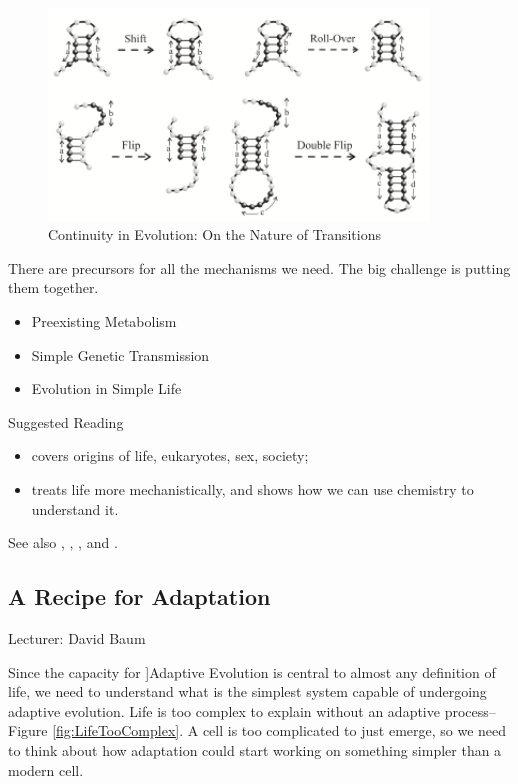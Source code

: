 \documentclass[]{article}
\begin{document}
\begin{figure}[H]
	\caption{Continuity in Evolution: On the Nature of Transitions}\label{fig:ContinuityInEvolution}
	\includegraphics[width=0.9\textwidth]{ContinuityInEvolution}
\end{figure}
There are precursors for all the mechanisms we need. The big challenge is putting them together.
\begin{itemize}
	\item Preexisting Metabolism
	\item Simple Genetic Transmission
	\item Evolution in Simple Life
\end{itemize}

Suggested Reading
\begin{itemize}
	\item \cite{maynard1999origins} covers origins of life, eukaryotes, sex, society; 
	\item \cite{sumper1975evidence} treats life more mechanistically, and shows how we can use chemistry to understand it.
\end{itemize}

See also \cite{orgel2004prebiotic}, \cite{eigen1971selforganization}, \cite{kun2005real}, and \cite{ratcliff2014experimental}.

\subsection{A Recipe for Adaptation}

Lecturer: David Baum

Since the capacity for ]Adaptive Evolution is central to almost any definition of life, we need to understand what is the simplest system capable of undergoing adaptive evolution. Life is too complex to explain without an adaptive
process--Figure \ref{fig:LifeTooComplex}\cite{hoyle1983intelligent}. A cell is too complicated to  just emerge, so we need to think about how adaptation could start working on something simpler than a modern cell.
\end{document}
